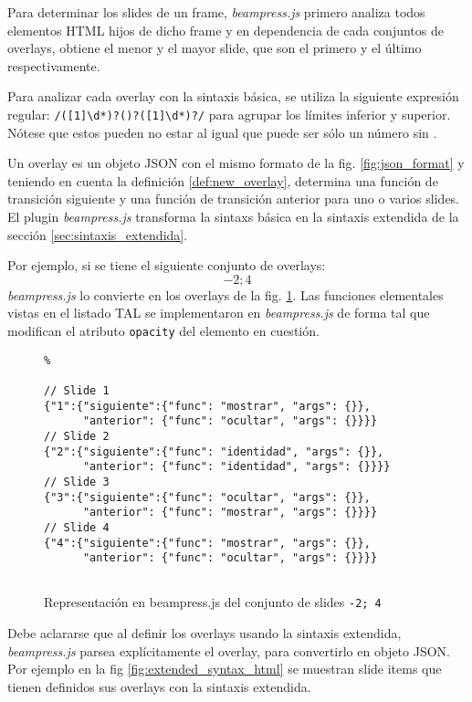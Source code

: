 			Para determinar los slides de un frame, \textit{beampress.js} primero analiza todos elementos HTML hijos de dicho frame y en dependencia de cada conjuntos de overlays, obtiene el menor y el mayor slide, que son el primero y el último respectivamente.

			Para analizar cada overlay con la sintaxis básica, se utiliza la siguiente expresión regular: \texttt{/([1]\textbackslash d*)?(\textendash )?([1]\textbackslash d*)?/} para agrupar los límites inferior y superior. Nótese que estos pueden no estar al igual que puede ser sólo un número sin \texttt{\textendash}. 

			Un overlay es un objeto JSON con el mismo formato de la fig. \ref{fig:json_format} y teniendo en cuenta la definición \ref{def:new_overlay}, determina una función de transición siguiente y una función de transición anterior para uno o varios slides. El plugin \textit{beampress.js} transforma la sintaxs básica en la sintaxis extendida de la sección \ref{sec:sintaxis_extendida}. 

			Por ejemplo, si se tiene el siguiente conjunto de overlays: $$-2; 4$$ \textit{beampress.js} lo convierte en los overlays de la fig. \ref{fig:overlay_set_beampress}. Las funciones elementales vistas en el listado TAL se implementaron en \textit{beampress.js} de forma tal que modifican el atributo \texttt{opacity} del elemento en cuestión.

				\begin{figure}[htb]%
					\begin{lstlisting}%

// Slide 1
{"1":{"siguiente":{"func": "mostrar", "args": {}},
      "anterior": {"func": "ocultar", "args": {}}}} 
// Slide 2
{"2":{"siguiente":{"func": "identidad", "args": {}},
      "anterior": {"func": "identidad", "args": {}}}}  
// Slide 3
{"3":{"siguiente":{"func": "ocultar", "args": {}},
      "anterior": {"func": "mostrar", "args": {}}}}  
// Slide 4
{"4":{"siguiente":{"func": "mostrar", "args": {}},
      "anterior": {"func": "ocultar", "args": {}}}}                                       				
	
					\end{lstlisting}
					\caption{Representación en beampress.js del conjunto de slides \texttt{-2; 4}}
					\label{fig:overlay_set_beampress}
				\end{figure}			
					
		
			
			Debe aclararse que al definir los overlays usando la sintaxis extendida, \textit{beampress.js} parsea explícitamente el overlay, para convertirlo en objeto JSON. Por ejemplo en la fig \ref{fig:extended_syntax_html} se muestran slide items que tienen definidos sus overlays con la sintaxis extendida.

